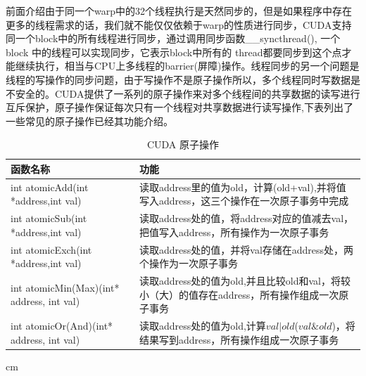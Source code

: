 前面介绍由于同一个warp中的32个线程执行是天然同步的，但是如果程序中存在更多的线程需求的话，我们就不能仅仅依赖于warp的性质进行同步，CUDA支持同一个block中的所有线程进行同步，通过调用同步函数\_\_syncthread(), 一个block 中的线程可以实现同步，它表示block中所有的 thread都要同步到这个点才能继续执行，相当与CPU上多线程的barrier(屏障)操作。线程同步的另一个问题是线程的写操作的同步问题，由于写操作不是原子操作所以，多个线程同时写数据是不安全的。CUDA提供了一系列的原子操作来对多个线程间的共享数据的读写进行互斥保护，原子操作保证每次只有一个线程对共享数据进行读写操作,下表列出了一些常见的原子操作已经其功能介绍。
\begin{table}[t]
\newcommand{\tabincell}[2]{\begin{tabular}{@{}#1@{}}#2\end{tabular}}
\setlength{\abovecaptionskip}{0.2cm}
\scriptsize{
\caption{CUDA 原子操作}
\renewcommand{\tabcolsep}{0.09cm}
\renewcommand{\arraystretch}{0.8}
\centering
\begin{tabular}{|p{6cm}<{\centering}|p{6cm}<{\centering}|}
\hline 函数名称& 功能\\ \hline
int atomicAdd(int *address,int val)&读取address里的值为old，计算(old+val),并将值写入address，这三个操作在一次原子事务中完成\\ \hline
int atomicSub(int *address,int val)&读取address处的值，将address对应的值减去val，把值写入address，所有操作为一次原子事务\\ \hline
int atomicExch(int *address,int val)&读取address处的值，并将val存储在address处，两个操作为一次原子事务\\ \hline
int atomicMin(Max)(int* address, int val)&读取address处的值为old,并且比较old和val，将较小（大）的值存在address，所有操作组成一次原子事务\\ \hline
int atomicOr(And)(int* address, int val)&读取address处的值为old,计算$val|old$($val \& old$)，将结果写到address，所有操作组成一次原子事务\\ \hline
\end{tabular}
  cm

  \label{CY}
}
\end{table}
